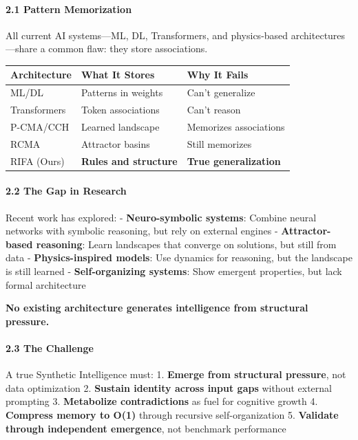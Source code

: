\documentclass[
  11pt,
  a4paper,
]{article}
\begin{document}
\paragraph{2.1 Pattern Memorization}\label{pattern-memorization}

All current AI systems---ML, DL, Transformers, and physics-based
architectures---share a common flaw: they store associations.

\begin{longtable}[]{@{}lll@{}}
\toprule\noalign{}
Architecture & What It Stores & Why It Fails \\
\midrule\noalign{}
\endhead
\bottomrule\noalign{}
\endlastfoot
ML/DL & Patterns in weights & Can't generalize \\
Transformers & Token associations & Can't reason \\
P-CMA/CCH & Learned landscape & Memorizes associations \\
RCMA & Attractor basins & Still memorizes \\
RIFA (Ours) & \textbf{Rules and structure} & \textbf{True
generalization} \\
\end{longtable}

\paragraph{2.2 The Gap in Research}\label{the-gap-in-research}

Recent work has explored: - \textbf{Neuro-symbolic systems}: Combine
neural networks with symbolic reasoning, but rely on external engines -
\textbf{Attractor-based reasoning}: Learn landscapes that converge on
solutions, but still from data - \textbf{Physics-inspired models}: Use
dynamics for reasoning, but the landscape is still learned -
\textbf{Self-organizing systems}: Show emergent properties, but lack
formal architecture

\textbf{No existing architecture generates intelligence from structural
pressure.}

\paragraph{2.3 The Challenge}\label{the-challenge}

A true Synthetic Intelligence must: 1. \textbf{Emerge from structural
pressure}, not data optimization 2. \textbf{Sustain identity across
input gaps} without external prompting 3. \textbf{Metabolize
contradictions} as fuel for cognitive growth 4. \textbf{Compress memory
to O(1)} through recursive self-organization 5. \textbf{Validate through
independent emergence}, not benchmark performance
\end{document}
